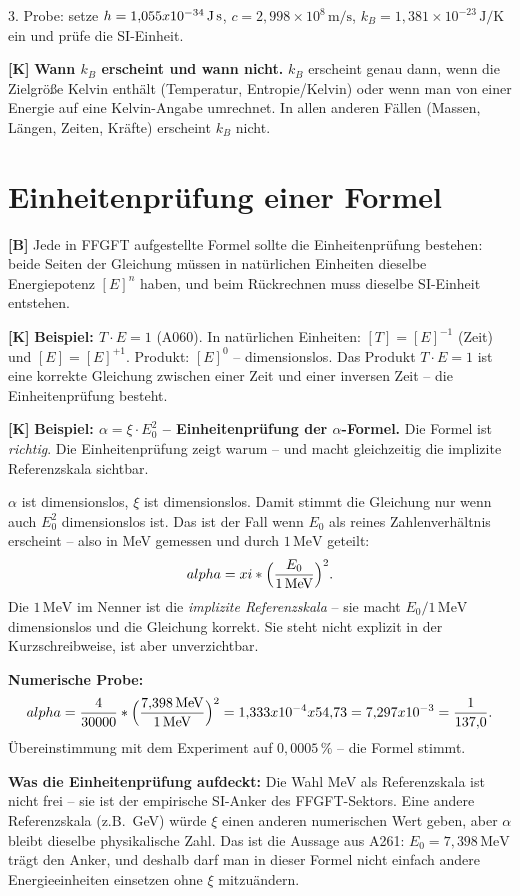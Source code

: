 3. Probe: setze $\hbar=1{,}055\times10^{-34}\,\text{J\,s}$,
   $c=2{,}998\times10^8\,\text{m/s}$,
   $k_B=1{,}381\times10^{-23}\,\text{J/K}$ ein und prüfe die SI-Einheit.

\textbf{[K]} \textbf{Wann $k_B$ erscheint und wann nicht.} $k_B$ erscheint genau
dann, wenn die Zielgröße Kelvin enthält (Temperatur, Entropie/Kelvin) oder wenn
man von einer Energie auf eine Kelvin-Angabe umrechnet. In allen anderen Fällen
(Massen, Längen, Zeiten, Kräfte) erscheint $k_B$ nicht.

\section{Einheitenprüfung einer Formel}

\textbf{[B]} Jede in FFGFT aufgestellte Formel sollte die Einheitenprüfung
bestehen: beide Seiten der Gleichung müssen in natürlichen Einheiten dieselbe
Energiepotenz $[E]^n$ haben, und beim Rückrechnen muss dieselbe SI-Einheit
entstehen.

\textbf{[K]} \textbf{Beispiel: $T\cdot E = 1$} (A060). In natürlichen Einheiten:
$[T]=[E]^{-1}$ (Zeit) und $[E]=[E]^{+1}$. Produkt: $[E]^0$ -- dimensionslos.
Das Produkt $T\cdot E=1$ ist eine korrekte Gleichung zwischen einer Zeit und
einer inversen Zeit -- die Einheitenprüfung besteht.

\textbf{[K]} \textbf{Beispiel: $\alpha=\xi\cdot E_0^2$ -- Einheitenprüfung der
$\alpha$-Formel.} Die Formel ist \emph{richtig}. Die Einheitenprüfung zeigt
warum -- und macht gleichzeitig die implizite Referenzskala sichtbar.

$\alpha$ ist dimensionslos, $\xi$ ist dimensionslos. Damit stimmt die Gleichung
nur wenn auch $E_0^2$ dimensionslos ist. Das ist der Fall wenn $E_0$ als reines
Zahlenverhältnis erscheint -- also in MeV gemessen und durch $1\,\text{MeV}$
geteilt:
\[
  \alpha = \xi\cdot\Bigl(\frac{E_0}{1\,\text{MeV}}\Bigr)^2.
\]
Die $1\,\text{MeV}$ im Nenner ist die \emph{implizite Referenzskala} -- sie
macht $E_0/1\,\text{MeV}$ dimensionslos und die Gleichung korrekt. Sie steht
nicht explizit in der Kurzschreibweise, ist aber unverzichtbar.

\textbf{Numerische Probe:}
\[
  \alpha = \frac{4}{30000}\cdot\Bigl(\frac{7{,}398\,\text{MeV}}{1\,\text{MeV}}\Bigr)^2
  = 1{,}333\times10^{-4}\times54{,}73
  = 7{,}297\times10^{-3}
  = \frac{1}{137{,}0}.
\]
Übereinstimmung mit dem Experiment auf $0{,}0005\,\%$ -- die Formel stimmt.

\textbf{Was die Einheitenprüfung aufdeckt:} Die Wahl MeV als Referenzskala ist
nicht frei -- sie ist der empirische SI-Anker des FFGFT-Sektors. Eine andere
Referenzskala (z.B.\ GeV) würde $\xi$ einen anderen numerischen Wert geben,
aber $\alpha$ bleibt dieselbe physikalische Zahl. Das ist die Aussage aus A261:
$E_0=7{,}398\,\text{MeV}$ trägt den Anker, und deshalb darf man in dieser
Formel nicht einfach andere Energieeinheiten einsetzen ohne $\xi$ mitzuändern.

